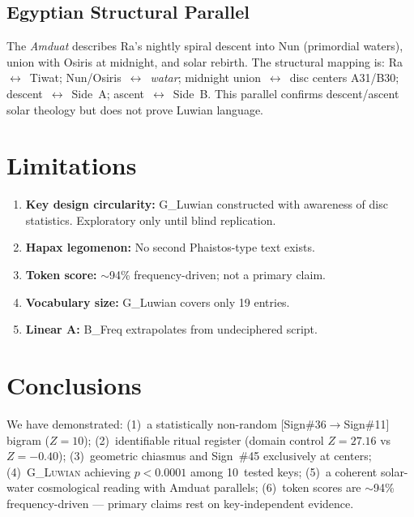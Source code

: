 \documentclass[12pt,a4paper]{article}
\begin{document}
\subsection{Egyptian Structural Parallel}

The \textit{Amduat} describes Ra's nightly spiral descent into Nun (primordial waters), union with Osiris at midnight, and solar rebirth. The structural mapping is: Ra~$\leftrightarrow$~Tiwat; Nun/Osiris~$\leftrightarrow$~\textit{watar}; midnight union~$\leftrightarrow$~disc centers A31/B30; descent~$\leftrightarrow$~Side~A; ascent~$\leftrightarrow$~Side~B. This parallel confirms descent/ascent solar theology but does not prove Luwian language.

\section{Limitations}

\begin{enumerate}
    \item \textbf{Key design circularity:} G\_Luwian constructed with awareness of disc statistics. Exploratory only until blind replication.
    \item \textbf{Hapax legomenon:} No second Phaistos-type text exists.
    \item \textbf{Token score:} $\sim$94\% frequency-driven; not a primary claim.
    \item \textbf{Vocabulary size:} G\_Luwian covers only 19 entries.
    \item \textbf{Linear A:} B\_Freq extrapolates from undeciphered script.
\end{enumerate}

\section{Conclusions}

We have demonstrated: (1)~a statistically non-random [Sign\#36$\to$Sign\#11] bigram ($Z=10$); (2)~identifiable ritual register (domain control $Z=27.16$ vs $Z=-0.40$); (3)~geometric chiasmus and Sign~\#45 exclusively at centers; (4)~\textsc{G\_Luwian} achieving $p<0.0001$ among 10~tested keys; (5)~a coherent solar-water cosmological reading with Amduat parallels; (6)~token scores are $\sim$94\% frequency-driven --- primary claims rest on key-independent evidence.
\end{document}
